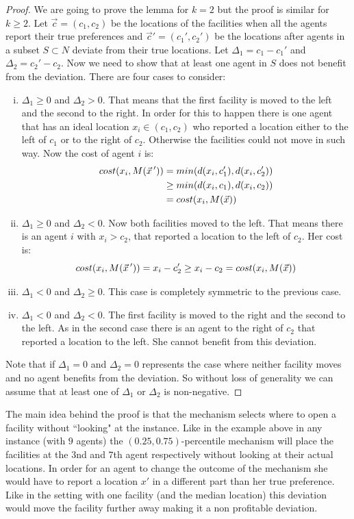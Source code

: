 \begin{proof}
We are going to prove the lemma for $k=2$ but the proof is similar for $k\ge2$. Let $\vec{c}=(c_1,c_2)$ be the locations of the facilities when all the agents report their true preferences and $\vec{c}'=(c_1',c_2')$ be the locations after agents in a subset $S\subset N$ deviate from their true locations. Let $\Delta_1 = c_1-c_1'$ and $\Delta_2 = c_2'-c_2$. Now we need to show that at least one agent in $S$ does not benefit from the deviation. There are four cases to consider:
\begin{enumerate}[(i)]
    \item $\Delta_1\ge0$ and $\Delta_2>0$. That means that the first facility is moved to the left and the second to the right. In order for this to happen there is one agent that has an ideal location $x_i \in (c_1,c_2)$ who reported a location either to the left of $c_1$ or to the right of $c_2$. Otherwise the facilities could not move in such way. Now the cost of agent $i$ is:
    \begin{align*}
        cost(x_i,M(\vec{x}\,')) &= min(d(x_i,c_1'),d(x_i,c_2'))\\
        &\ge min(d(x_i,c_1),d(x_i,c_2))\\
        &= cost(x_i,M(\vec{x}))
    \end{align*}
    \item $\Delta_1\ge0$ and $\Delta_2<0$. Now both facilities moved to the left. That means there is an agent $i$ with $x_i>c_2$, that reported a location to the left of $c_2$. Her cost is:
    \[ cost(x_i,M(\vec{x}\,')) = x_i -c_2' \ge x_i-c_2 = cost(x_i,M(\vec{x}))\]
    \item $\Delta_1<0$ and $\Delta_2\ge0$. This case is completely symmetric to the previous case.
    \item $\Delta_1<0$ and $\Delta_2<0$. The first facility is moved to the right and the second to the left. As in the second case there is an agent to the right of $c_2$ that reported a location to the left. She cannot benefit from this deviation.
\end{enumerate}
Note that if $\Delta_1=0$ and $\Delta_2=0$ represents the case where neither facility moves and no agent benefits from the deviation. So without loss of generality we can assume that at least one of $\Delta_1$ or $\Delta_2$ is non-negative. 

\end{proof}
 
The main idea behind the proof is that the mechanism selects where to open a facility without ``looking" at the instance. Like in the example above in any instance (with $9$ agents) the $(0.25,0.75)$-percentile mechanism  will place the facilities at the $3$nd and $7$th agent respectively without looking at their actual locations. In order for an agent to change the outcome of the mechanism she would have to report a location $x'$ in a different part than her true preference. Like in the setting with one facility (and the median location) this deviation would move the facility further away making it a non profitable deviation. 


